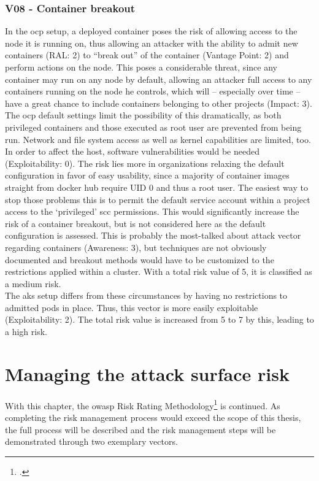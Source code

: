 \subsection{V08 - Container breakout}

In the \gls{ocp} setup, a deployed container poses the risk of allowing access to the node it is running on, thus allowing an attacker with the ability to admit new containers (RAL: 2) to “break out” of the container (Vantage Point: 2) and perform actions on the node.
This poses a considerable threat, since any container may run on any node by default, allowing an attacker full access to any containers running on the node he controls, which will – especially over time – have a great chance to include containers belonging to other projects (Impact: 3).
The \gls{ocp} default settings limit the possibility of this dramatically, as both privileged containers and those executed as root user are prevented from being run. Network and file system access as well as kernel capabilities are limited, too. In order to affect the host, software vulnerabilities would be needed (Exploitability: 0).
The risk lies more in organizations relaxing the default configuration in favor of easy usability, since a majority of container images straight from docker hub require UID 0 and thus a root user. The easiest way to stop those problems this is to permit the default service account within a project access to the ‘privileged’ \gls{scc} permissions. This would significantly increase the risk of a container breakout, but is not considered here as the default configuration is assessed.
This is probably the most-talked about attack vector regarding containers (Awareness: 3), but techniques are not obviously documented and breakout methods would have to be customized to the restrictions applied within a cluster.
With a total risk value of 5, it is classified as a medium risk. \\
The \gls{aks} setup differs from these circumstances by having no restrictions to admitted pods in place. Thus, this vector is more easily exploitable (Exploitability: 2).
The total risk value is increased from 5 to 7 by this, leading to a high risk.

\chapter{Managing the attack surface risk} \label{riskMgmtTotal}
\setcounter{footnote}{0}
With this chapter, the \gls{owasp} Risk Rating Methodology\footcite{riskRating} is continued. As completing the risk management process would exceed the scope of this thesis, the full process will be described and the risk management steps will be demonstrated through two exemplary vectors.

